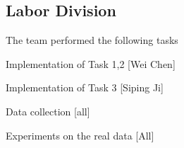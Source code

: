 
\subsection{Labor Division}

The team performed the following tasks
\bit
\item Implementation of Task 1,2 [Wei Chen]
\item Implementation of Task 3 [Siping Ji]
\item Data collection [all]
\item Experiments on the real data [All]
\eit




